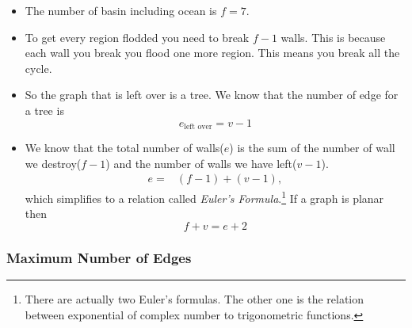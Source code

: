 \documentclass[a4paper, 12pt]{article}
\begin{document}
	\begin{itemize}
		\item The number of basin including ocean is $f=7$.
		\item To get every region flodded you need to break $f-1$ walls. This is because each wall you break you flood one more region. This means you break all the cycle.
			\begin{center}
			\end{center}
		\item So the graph that is left over is a tree. We know that the number of edge for a tree is
		\[
			e_\text{left over} = v-1
		\]
		\item We know that the total number of walls($e$) is the sum of the number of wall we destroy($f-1$) and the number of walls we have left($v-1$).
		\begin{align*}
			e =& (f-1) + (v-1),
		\end{align*}
		which simplifies to a relation called \emph{Euler's Formula}.\footnote{There are actually two Euler's formulas. The other one is the relation between exponential of complex number to trigonometric functions.} If a graph is planar then
		\[
			f + v = e+2
		\]
	\end{itemize}
	
	\subsubsection*{Maximum Number of Edges}
	
\end{document}
